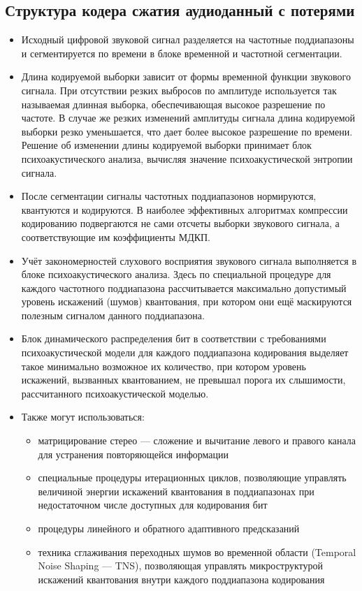 \documentclass[a4paper]{report}
\begin{document}
\subsection{Структура кодера сжатия аудиоданный с потерями}
\begin{itemize}
\item Исходный цифровой звуковой сигнал разделяется на частотные поддиапазоны и сегментируется по времени в блоке временной и частотной сегментации.
\item Длина кодируемой выборки зависит от формы временной функции звукового сигнала. При отсутствии резких выбросов по амплитуде используется так называемая длинная выборка, обеспечивающая высокое разрешение по частоте. В случае же резких изменений амплитуды сигнала длина кодируемой выборки резко уменьшается, что дает более высокое разрешение по времени. Решение об изменении длины кодируемой выборки принимает блок психоакустического анализа, вычисляя значение психоакустической энтропии сигнала.
\item После сегментации сигналы частотных поддиапазонов нормируются, квантуются и кодируются. В наиболее эффективных алгоритмах компрессии кодированию подвергаются не сами отсчеты выборки звукового сигнала, а соответствующие им коэффициенты МДКП.
\item Учёт закономерностей слухового восприятия звукового сигнала выполняется в блоке психоакустического анализа. Здесь по специальной процедуре для каждого частотного поддиапазона рассчитывается максимально допустимый уровень искажений (шумов) квантования, при котором они ещё маскируются полезным сигналом данного поддиапазона.
\item Блок динамического распределения бит в соответствии с требованиями психоакустической модели для каждого поддиапазона кодирования выделяет такое минимально возможное их количество, при котором уровень искажений, вызванных квантованием, не превышал порога их слышимости, рассчитанного психоакустической моделью.
\item Также могут использоваться:
\begin{itemize}
\item матрицирование стерео — сложение и вычитание левого и правого канала для устранения повторяющейся информации
\item специальные процедуры итерационных циклов, позволяющие управлять величиной энергии искажений квантования в поддиапазонах при недостаточном числе доступных для кодирования бит
\item процедуры линейного и обратного адаптивного предсказаний
\item техника сглаживания переходных шумов во временной области (Temporal Noise Shaping — TNS), позволяющая управлять микроструктурой искажений квантования внутри каждого поддиапазона кодирования
\end{itemize}
\end{itemize}
\end{document}

